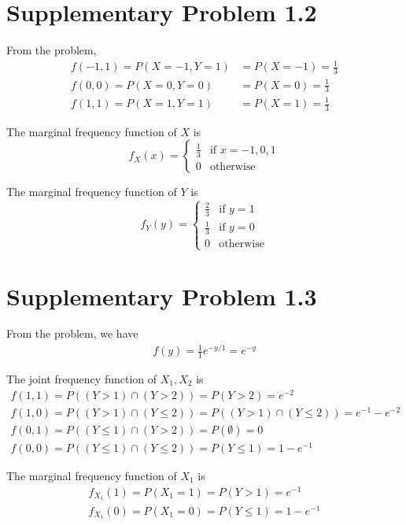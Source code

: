 \documentclass[a4paper, UTF-8]{article}
\theoremstyle{plain}
\begin{document}
\section{Supplementary Problem 1.2}

From the problem, 
\begin{align*} 
f(-1, 1) = P(X = -1, Y = 1) &= P(X = -1) = \frac{1}{3}\\ 
f(0, 0) = P(X = 0, Y = 0) &= P(X = 0) = \frac{1}{3}\\
f(1, 1) = P(X = 1, Y = 1) &= P(X = 1) = \frac{1}{3}
\end{align*}

The marginal frequency function of $X$ is 
$$
f_X(x) = \begin{cases}
\frac{1}{3} & \text{if } x = -1, 0, 1\\
0 & \text{otherwise}
\end{cases}
$$

The marginal frequency function of $Y$ is
$$
f_Y(y) = \begin{cases}
\frac{2}{3} & \text{if } y = 1\\
\frac{1}{3} & \text{if } y = 0\\
0 & \text{otherwise}
\end{cases}
$$


\section{Supplementary Problem 1.3}

From the problem, we have
\begin{align*}
f(y) = \frac{1}{1}e^{-y/1} = e^{-y}
\end{align*}

The joint frequency function of $X_1, X_2$ is 
\begin{align*} 
f(1, 1) = P((Y > 1) \cap (Y > 2)) = P(Y > 2) = e^{-2}\\
f(1, 0) = P((Y > 1) \cap (Y \leq 2)) = P((Y > 1) \cap (Y \leq 2)) = e^{-1} - e^{-2}\\
f(0, 1) = P((Y \leq 1) \cap (Y > 2)) = P(\emptyset) = 0\\
f(0, 0) = P((Y \leq 1) \cap (Y \leq 2)) = P(Y \leq 1) = 1 - e^{-1}
\end{align*}

The marginal frequency function of $X_1$ is
\begin{align*}
f_{X_1}(1) = P(X_1 = 1) = P(Y > 1) = e^{-1}\\
f_{X_1}(0) = P(X_1 = 0) = P(Y \leq 1) = 1 - e^{-1}
\end{align*}
\end{document}
